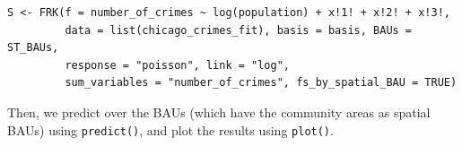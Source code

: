 \documentclass[12pt,a4paper]{article}
\begin{document}
\begin{minipage}{\linewidth}
\begin{lstlisting}[style=R]
S <- FRK(f = number_of_crimes ~ log(population) + x!1! + x!2! + x!3!,   
         data = list(chicago_crimes_fit), basis = basis, BAUs = ST_BAUs,         
         response = "poisson", link = "log", 
         sum_variables = "number_of_crimes", fs_by_spatial_BAU = TRUE) 
\end{lstlisting}
\end{minipage}


Then, we predict over the BAUs (which have the community areas as spatial BAUs) using \texttt{predict()}, and plot the results using \texttt{plot()}.

%
%
%                  
%
\end{document}

